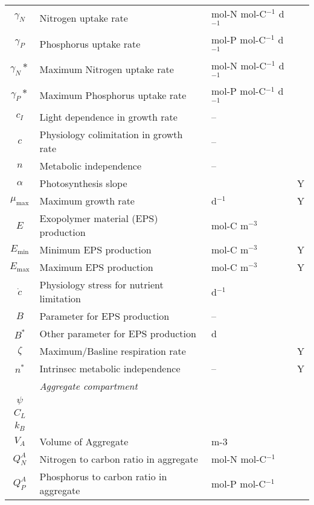 \documentclass[fleqn]{article}                     %
\begin{document}
\begin{table*}[h]
\begin{tabular}{clll}
    $\gamma_N$ & Nitrogen uptake rate & mol-N mol-C$^{-1}$ d$^{-1}$ \\
    $\gamma_P$ & Phosphorus uptake rate & mol-P mol-C$^{-1}$ d$^{-1}$ \\
    $\gamma_N*$ & Maximum Nitrogen uptake rate & mol-N mol-C$^{-1}$ d$^{-1}$ \\
    $\gamma_P*$ & Maximum Phosphorus uptake rate & mol-P mol-C$^{-1}$ d$^{-1}$ \\
    $c_I$ & Light dependence in growth rate & -- \\
    $c$ & Physiology colimitation in growth rate & -- \\
    $n$ & Metabolic independence & -- \\
    $\alpha$ & Photosynthesis slope & &Y \\
    $\mu_{\textrm{max}}$ & Maximum growth rate & d$^{-1}$ &Y\\
    $E$ & Exopolymer material (EPS) production & mol-C m$^{-3}$ \\
    $E_{\textrm{min}}$ & Minimum EPS production & mol-C m$^{-3}$&Y \\
    $E_{\textrm{max}}$ & Maximum EPS production & mol-C m$^{-3}$ &Y\\
    $\dot{c}$ & Physiology stress for nutrient limitation & d$^{-1}$ \\
    $B$ & Parameter for EPS production & -- \\
    $B^*$ & Other parameter for EPS production & d \\
    $\zeta$ & Maximum/Basline respiration rate &&Y\\
    $n^*$ & Intrinsec metabolic independence & --&Y \\ \hline
    & \emph{Aggregate compartment} & \\
    $\psi$ &&\\
    $C_L$ &&\\
    $k_B$&&\\
    $V_A$ & Volume of Aggregate & m-3 \\
    $Q^A_N$ & Nitrogen to carbon ratio in aggregate & mol-N mol-C$^{-1}$ \\
    $Q^A_P$ & Phosphorus to carbon ratio in aggregate & mol-P mol-C$^{-1}$ \\
    \hline
  \end{tabular}
\end{table*}
\end{document}
